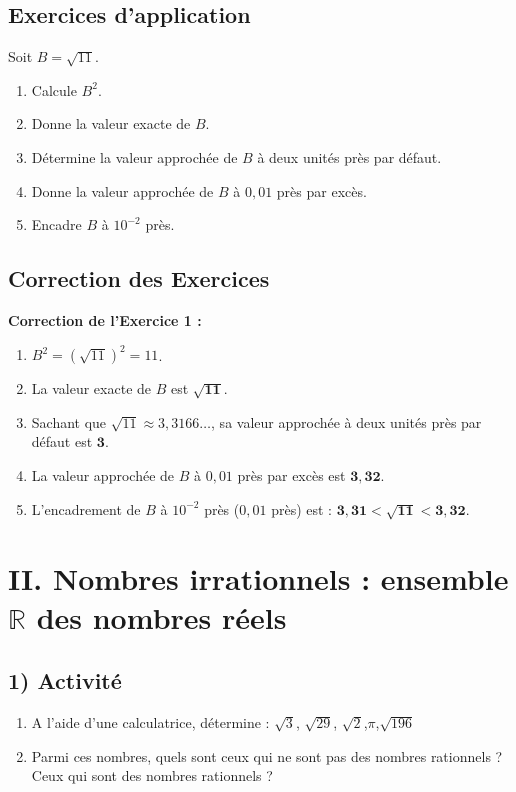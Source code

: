 \documentclass[12pt,a4paper]{article}
\begin{document}
\subsection*{\color{myred} Exercices d'application}
 Soit $B = \sqrt{11}$.
\begin{enumerate}[label=\alph*)]
    \item Calcule $B^2$.
    \item Donne la valeur exacte de $B$.
    \item Détermine la valeur approchée de $B$ à deux unités près par défaut.
    \item Donne la valeur approchée de $B$ à $0{,}01$ près par excès.
    \item Encadre $B$ à $10^{-2}$ près.
\end{enumerate}

\subsection*{\color{myred} Correction des Exercices}

\noindent \textbf{Correction de l'Exercice 1 :}
\begin{enumerate}[label=\alph*)]
    \item $B^2 = (\sqrt{11})^2 = 11$.
    \item La valeur exacte de $B$ est $\mathbf{\sqrt{11}}$.
    \item Sachant que $\sqrt{11} \approx 3{,}3166\dots$, sa valeur approchée à deux unités près par défaut est $\mathbf{3}$.
    \item La valeur approchée de $B$ à $0{,}01$ près par excès est $\mathbf{3{,}32}$.
    \item L'encadrement de $B$ à $10^{-2}$ près ($0{,}01$ près) est : $\mathbf{3{,}31 < \sqrt{11} < 3{,}32}$.
\end{enumerate}

\section*{\color{myred}II. Nombres irrationnels : ensemble $\mathbb{R}$ des nombres réels}

\subsection*{\color{myred} 1) Activité}
\begin{enumerate}
    \item A l’aide d’une calculatrice, détermine : $\sqrt{3}$, $\sqrt{29}$, $\sqrt{2}$,$\pi$,$\sqrt{196}$
    \item Parmi ces nombres, quels sont ceux qui ne sont pas des nombres rationnels ?
Ceux qui sont des nombres rationnels ?
\end{enumerate} 
\end{document}
